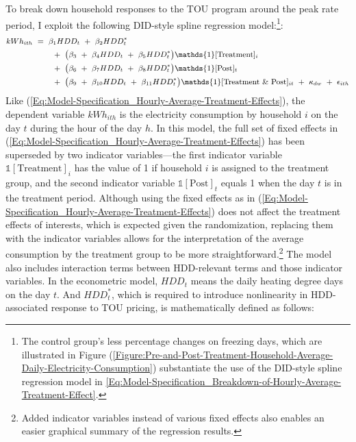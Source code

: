 
To break down household responses to the TOU program around the peak rate period, I exploit the following DID-style spline regression model:\footnote{The control group's less percentage changes on freezing days, which are illustrated in Figure (\ref{Figure:Pre-and-Post-Treatment-Household-Average-Daily-Electricity-Consumption}) substantiate the use of the DID-style spline regression model in \ref{Eq:Model-Specification_Breakdown-of-Hourly-Average-Treatment-Effect}.}:
\begin{equation}
\small
\begin{split}
    kWh_{ith} \
    & = \ \beta_{1} HDD_{t} \ + \ \beta_{2} HDD_{t}^{*} \\
    & \hspace{0.7cm} + \ \big( \beta_{3} \ + \ \beta_{4} HDD_{t} \ + \ \beta_{5} HDD_{t}^{*} \big) \mathds{1}[\text{Treatment}]_{i} \\
    & \hspace{0.7cm} + \ \big( \beta_{6} \ + \ \beta_{7} HDD_{t} \ + \ \beta_{8} HDD_{t}^{*} \big) \mathds{1}[\text{Post}]_{t} \\
    & \hspace{0.7cm} + \ \big( \beta_{9} \ + \ \beta_{10} HDD_{t} \ + \ \beta_{11} HDD_{t}^{*} \big) \mathds{1}[\text{Treatment \& Post}]_{it} \ + \ \kappa_{dw} \ + \ \epsilon_{ith} 
\end{split}
\label{Eq:Model-Specification_Breakdown-of-Hourly-Average-Treatment-Effect}
\end{equation}
Like (\ref{Eq:Model-Specification_Hourly-Average-Treatment-Effects}), the dependent variable $kWh_{ith}$ is the electricity consumption by household $i$ on the day $t$ during the hour of the day $h$. In this model, the full set of fixed effects in (\ref{Eq:Model-Specification_Hourly-Average-Treatment-Effects}) has been superseded by two indicator variables---the first indicator variable $\mathbb{1}[\text{Treatment}]_{i}$ has the value of 1 if household $i$ is assigned to the treatment group, and the second indicator variable $\mathbb{1}[\text{Post}]_{t}$ equals 1 when the day $t$ is in the treatment period. Although using the fixed effects as in (\ref{Eq:Model-Specification_Hourly-Average-Treatment-Effects}) does not affect the treatment effects of interests, which is expected given the randomization, replacing them with the indicator variables allows for the interpretation of the average consumption by the treatment group to be more straightforward.\footnote{Added indicator variables instead of various fixed effects also enables an easier graphical summary of the regression results.} The model also includes interaction terms between HDD-relevant terms and those indicator variables. In the econometric model, $HDD_{t}$ means the daily heating degree days on the day $t$. And $HDD_{t}^{*}$, which is required to introduce nonlinearity in HDD-associated response to TOU pricing, is mathematically defined as follows:
